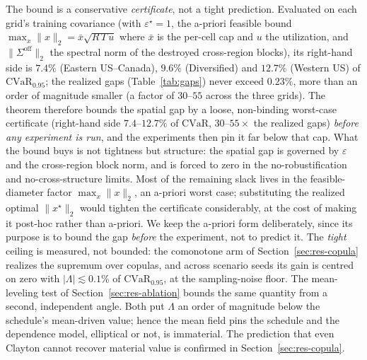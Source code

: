 \documentclass[12pt]{article}
\newcommand{\CVaR}{\mathrm{CVaR}}
\begin{document}
\noindent The bound is a conservative \emph{certificate}, not a tight prediction.
Evaluated on each grid's training covariance (with $\varepsilon^\star=1$, the
a-priori feasible bound $\max_{x}\lVert x\rVert_2=\bar x\sqrt{R\,T\,u}$ where $\bar
x$ is the per-cell cap and $u$ the utilization, and $\lVert\Sigma^{\mathrm{off}}
\rVert_2$ the spectral norm of the destroyed cross-region blocks), its right-hand
side is $7.4\%$ (Eastern US--Canada), $9.6\%$ (Diversified) and $12.7\%$ (Western
US) of $\CVaR_{0.95}$; the realized gaps (Table~\ref{tab:gaps}) never exceed
$0.23\%$, more than an order of magnitude smaller (a factor of $30$--$55$ across the
three grids). The theorem therefore bounds the spatial gap by a loose, non-binding
worst-case certificate (right-hand side $7.4$--$12.7\%$ of $\CVaR$, $30$--$55\times$ the
realized gaps) \emph{before any experiment
is run}, and the
experiments then pin it far below that cap. What the bound buys is not tightness but
structure: the spatial gap is governed by $\varepsilon$ and the cross-region block
norm, and is forced to zero in the no-robustification and no-cross-structure limits.
Most of the remaining slack lives in the feasible-diameter factor $\max_x\lVert
x\rVert_2$, an a-priori worst case; substituting the realized optimal $\lVert
x^\star\rVert_2$ would tighten the certificate considerably, at the cost of making it
post-hoc rather than a-priori. We keep the a-priori form deliberately, since its
purpose is to bound the gap \emph{before} the experiment, not to predict it. The
\emph{tight} ceiling is measured, not bounded: the comonotone arm of
Section~\ref{sec:res-copula} realizes the supremum over copulas, and across scenario
seeds its gain is centred on zero with $|\Lambda|\lesssim0.1\%$ of $\CVaR_{0.95}$, at
the sampling-noise floor. The mean-leveling test of Section~\ref{sec:res-ablation}
bounds the same quantity from a second, independent angle. Both put $\Lambda$ an
order of magnitude below the schedule's mean-driven value; hence the mean field pins
the schedule and the dependence model, elliptical or not, is immaterial. The prediction that even Clayton cannot recover material
value is confirmed in Section~\ref{sec:res-copula}.
\end{document}
